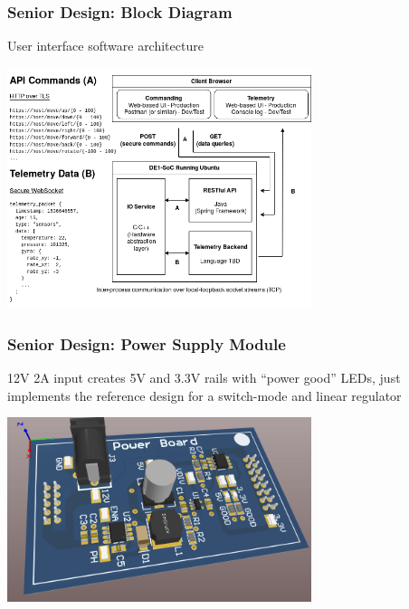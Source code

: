 \documentclass{beamer}
\begin{document}
\begin{frame}
\frametitle{Senior Design: Block Diagram}
    User interface software architecture
\begin{center}
    \includegraphics[width=3.5in]{assets/senior_design/display_controller}
\end{center}
\end{frame}

\begin{frame}
\frametitle{Senior Design: Power Supply Module}
    12V 2A input creates 5V and 3.3V rails with ``power good'' LEDs, just
    implements the reference design for a switch-mode and linear regulator
\begin{center}
    \includegraphics[width=3.5in]{assets/senior_design/power_3d}
\end{center}
\end{frame}

\end{document}
